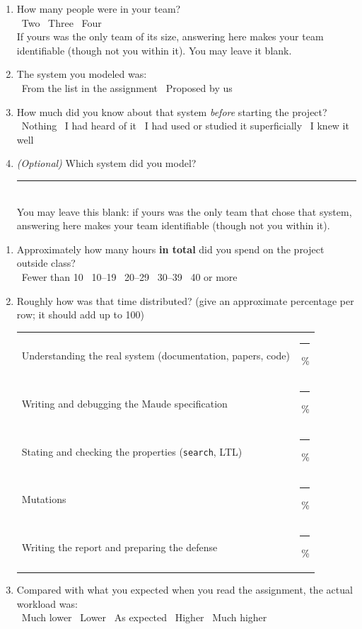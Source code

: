 \begin{enumerate}[leftmargin=*]

\item How many people were in your team?\\
\cb\ Two \qquad \cb\ Three \qquad \cb\ Four\\
{\small If yours was the only team of its size, answering here makes your
team identifiable (though not you within it). You may leave it blank.}

\item The system you modeled was:\\
\cb\ From the list in the assignment \qquad
\cb\ Proposed by us

\item How much did you know about that system \emph{before} starting the
project?\\
\cb\ Nothing \quad
\cb\ I had heard of it \quad
\cb\ I had used or studied it superficially \quad
\cb\ I knew it well

\item \emph{(Optional)} Which system did you model?
\rule{7cm}{0.4pt}\\
{\small You may leave this blank: if yours was the only team that chose that
system, answering here makes your team identifiable (though not you within
it).}

\end{enumerate}


\begin{enumerate}[leftmargin=*,resume]

\item Approximately how many hours \textbf{in total} did you spend on the
project outside class?\\
\cb\ Fewer than 10 \quad
\cb\ 10--19 \quad
\cb\ 20--29 \quad
\cb\ 30--39 \quad
\cb\ 40 or more

\item Roughly how was that time distributed? (give an approximate percentage
per row; it should add up to 100)

\smallskip
\begin{tabular}{@{}p{9cm}l@{}}
Understanding the real system (documentation, papers, code) & \rule{1.5cm}{0.4pt}\,\% \\
Writing and debugging the Maude specification & \rule{1.5cm}{0.4pt}\,\% \\
Stating and checking the properties (\texttt{search}, LTL) & \rule{1.5cm}{0.4pt}\,\% \\
Mutations & \rule{1.5cm}{0.4pt}\,\% \\
Writing the report and preparing the defense & \rule{1.5cm}{0.4pt}\,\% \\
\end{tabular}

\item Compared with what you expected when you read the assignment, the
actual workload was:\\
\cb\ Much lower \quad
\cb\ Lower \quad
\cb\ As expected \quad
\cb\ Higher \quad
\cb\ Much higher

\end{enumerate}

